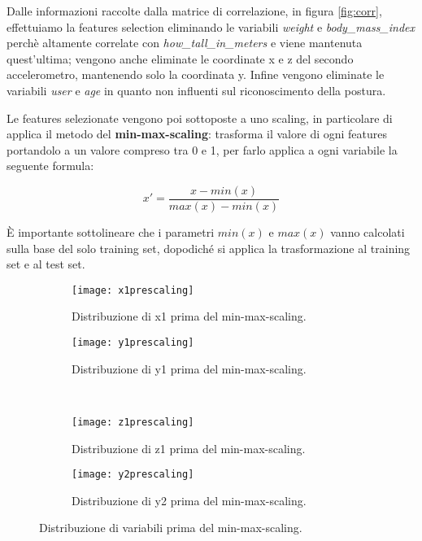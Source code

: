 Dalle informazioni raccolte dalla matrice di correlazione, in figura \ref{fig:corr}, effettuiamo la features selection eliminando le variabili \textit{weight} e \textit{body\_mass\_index} perchè altamente correlate con \textit{how\_tall\_in\_meters} e viene mantenuta quest'ultima; vengono anche eliminate le coordinate x e z del secondo accelerometro, mantenendo solo la coordinata y. Infine vengono eliminate le variabili \textit{user} e \textit{age} in quanto non influenti sul riconoscimento della postura.

Le features selezionate vengono poi sottoposte a uno scaling, in particolare di applica il metodo del \textbf{min-max-scaling}: trasforma il valore di ogni features portandolo a un valore compreso tra 0 e 1, per farlo applica a ogni variabile la seguente formula:

\begin{equation}
x' = \frac{x-min(x)}{max(x)-min(x)}
\end{equation}

È importante sottolineare che i parametri $min(x)$ e $max(x)$ vanno calcolati sulla base del solo training set, dopodiché si applica la trasformazione al training set e al test set.

\begin{figure}[ht]
    \centering
    \begin{subfigure}[t]{0.4\textwidth}
        \centering\texttt{[image: x1prescaling]}
        \caption{Distribuzione di x1 prima del min-max-scaling.}
        \label{fig:distprescaling:x1}
    \end{subfigure}
    \begin{subfigure}[t]{0.4\textwidth}
        \centering\texttt{[image: y1prescaling]}
        \caption{Distribuzione di y1 prima del min-max-scaling.}
        \label{fig:distprescaling:y1}
    \end{subfigure}
    \\
    \begin{subfigure}[t]{0.4\textwidth}
        \centering\texttt{[image: z1prescaling]}
        \caption{Distribuzione di z1 prima del min-max-scaling.}
        \label{fig:distprescaling:z1}
    \end{subfigure}
    \begin{subfigure}[t]{0.4\textwidth}
        \centering\texttt{[image: y2prescaling]}
        \caption{Distribuzione di y2 prima del min-max-scaling.}
        \label{fig:distprescaling:y2}
    \end{subfigure}
    \caption{Distribuzione di variabili prima del min-max-scaling.}
    \label{fig:distprescaling}
\end{figure}

